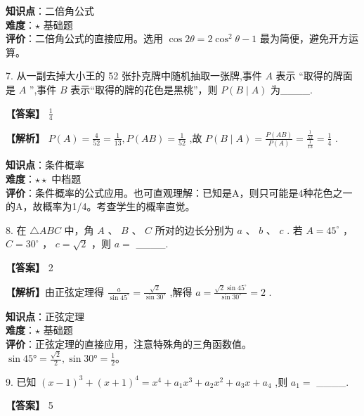 \documentclass[10pt]{article}
\begin{document}
\begin{analysisbox}[考点分析]
\textbf{知识点}：二倍角公式\\
\textbf{难度}：\(\star\) 基础题\\
\textbf{评价}：二倍角公式的直接应用。选用 \(\cos 2\theta = 2\cos^2\theta - 1\) 最为简便，避免开方运算。
\end{analysisbox}

7. 从一副去掉大小王的 52 张扑克牌中随机抽取一张牌,事件 \(A\) 表示 ``取得的牌面是 \(A\) '',事件 \(B\) 表示``取得的牌的花色是黑桃''，则 \(P\left( {B \mid  A}\right)\) 为\_\_\_\_.

\textbf{【答案】} \(\frac{1}{4}\)

\textbf{【解析】} \(P\left( A\right)  = \frac{4}{52} = \frac{1}{13},P\left( {AB}\right)  = \frac{1}{52}\) ,故 \(P\left( {B \mid  A}\right)  = \frac{P\left( {AB}\right) }{P\left( A\right) } = \frac{\frac{1}{52}}{\frac{1}{13}} = \frac{1}{4}\) .

\begin{analysisbox}[考点分析]
\textbf{知识点}：条件概率\\
\textbf{难度}：\(\star\star\) 中档题\\
\textbf{评价}：条件概率的公式应用。也可直观理解：已知是A，则只可能是4种花色之一的A，故概率为1/4。考查学生的概率直觉。
\end{analysisbox}

8. 在 \(\bigtriangleup  {ABC}\) 中，角 \(A\) 、 \(B\) 、 \(C\) 所对的边长分别为 \(a\) 、 \(b\) 、 \(c\) . 若 \(A = {45}^{ \circ  }\) ， \(C = {30}^{ \circ  }\) ， \(c = \sqrt{2}\) ，则 \(a =\) \_\_\_\_.

\textbf{【答案】} 2

\textbf{【解析】}由正弦定理得 \(\frac{a}{\sin {45}^{ \circ  }} = \frac{\sqrt{2}}{\sin {30}^{ \circ  }}\) ,解得 \(a = \frac{\sqrt{2}\sin {45}^{ \circ  }}{\sin {30}^{ \circ  }} = 2\) .

\begin{analysisbox}[考点分析]
\textbf{知识点}：正弦定理\\
\textbf{难度}：\(\star\) 基础题\\
\textbf{评价}：正弦定理的直接应用，注意特殊角的三角函数值。\(\sin 45° = \frac{\sqrt{2}}{2}, \sin 30° = \frac{1}{2}\)。
\end{analysisbox}

9. 已知 \({\left( x - 1\right) }^{3} + {\left( x + 1\right) }^{4} = {x}^{4} + {a}_{1}{x}^{3} + {a}_{2}{x}^{2} + {a}_{3}x + {a}_{4}\) ,则 \({a}_{1} =\) \_\_\_\_.

\textbf{【答案】} 5
\end{document}
